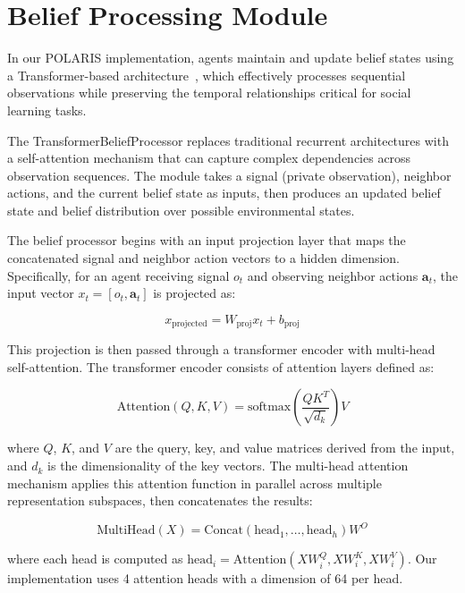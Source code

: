 \section{Belief Processing Module}

In our POLARIS implementation, agents maintain and update belief states using a Transformer-based architecture~\cite{vaswani2017attention}, which effectively processes sequential observations while preserving the temporal relationships critical for social learning tasks.

The TransformerBeliefProcessor replaces traditional recurrent architectures with a self-attention mechanism that can capture complex dependencies across observation sequences. The module takes a signal (private observation), neighbor actions, and the current belief state as inputs, then produces an updated belief state and belief distribution over possible environmental states.

The belief processor begins with an input projection layer that maps the concatenated signal and neighbor action vectors to a hidden dimension. Specifically, for an agent receiving signal $o_t$ and observing neighbor actions $\boldsymbol{a}_t$, the input vector $x_t = [o_t, \boldsymbol{a}_t]$ is projected as:

\begin{equation}
    x_{\text{projected}} = W_{\text{proj}}x_t + b_{\text{proj}}
\end{equation}

This projection is then passed through a transformer encoder with multi-head self-attention. The transformer encoder consists of attention layers defined as:

\begin{equation}
    \text{Attention}(Q, K, V) = \text{softmax}\left(\frac{QK^T}{\sqrt{d_k}}\right)V
\end{equation}

where $Q$, $K$, and $V$ are the query, key, and value matrices derived from the input, and $d_k$ is the dimensionality of the key vectors. The multi-head attention mechanism applies this attention function in parallel across multiple representation subspaces, then concatenates the results:

\begin{equation}
    \text{MultiHead}(X) = \text{Concat}(\text{head}_1, \ldots, \text{head}_h)W^O
\end{equation}

where each head is computed as $\text{head}_i = \text{Attention}(XW^Q_i, XW^K_i, XW^V_i)$. Our implementation uses 4 attention heads with a dimension of 64 per head.

